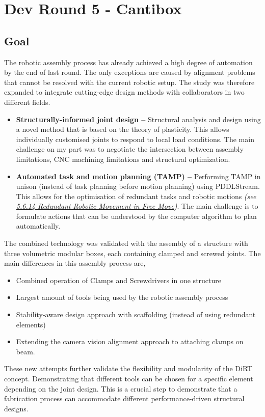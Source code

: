 \chapter{Dev Round 5 - Cantibox}

\section{Goal}

The robotic assembly process has already achieved a high degree of automation by the end of last round. The only exceptions are caused by alignment problems that cannot be resolved with the current robotic setup. The study was therefore expanded to integrate cutting-edge design methods with collaborators in two different fields. 

\begin{itemize}
	\item \textbf{Structurally-informed joint design --} Structural analysis and design using a novel method that is based on the theory of plasticity. This allows individually customised joints to respond to local load conditions. The main challenge on my part was to negotiate the intersection between assembly limitations, CNC machining limitations and structural optimization. 

	\item \textbf{Automated task and motion planning (TAMP) --} Performing TAMP in unison (instead of task planning before motion planning) using PDDLStream. This allows for the optimisation of redundant tasks and robotic motions \textit{(see \ul{5.6.14 Redundant Robotic Movement in Free Move})}. The main challenge is to formulate actions that can be understood by the computer algorithm to plan automatically. 

\end{itemize}
The combined technology was validated with the assembly of a structure with three volumetric modular boxes, each containing clamped and screwed joints. The main differences in this assembly process are,

\begin{itemize}
	\item Combined operation of Clamps and Screwdrivers in one structure

	\item Largest amount of tools being used by the robotic assembly process

	\item Stability-aware design approach with scaffolding (instead of using redundant elements)

	\item Extending the camera vision alignment approach to attaching clamps on beam.

\end{itemize}
These new attempts further validate the flexibility and modularity of the DiRT concept. Demonstrating that different tools can be chosen for a specific element depending on the joint design. This is a crucial step to demonstrate that a fabrication process can accommodate different performance-driven structural designs.  

